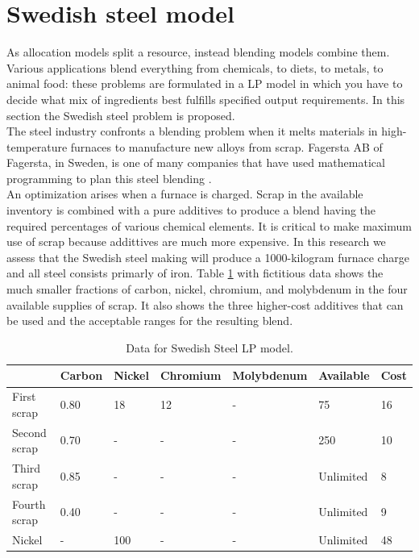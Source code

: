 \documentclass[a4paper,10 pt,titlepage,twoside]{report}
\theoremstyle{plain}
\theoremstyle{definition}
\theoremstyle{remark}
\begin{document}
{{\section{Swedish steel model}
As allocation models split a resource, instead blending models combine them. Various applications blend everything from chemicals, to diets, to metals, to animal food: these problems are formulated in a LP model in which you have to decide what mix of ingredients best fulfills specified output requirements. In this section the Swedish steel problem is proposed.\\
The steel industry confronts a blending problem when it melts materials in high-temperature furnaces to manufacture new alloys from scrap. Fagersta AB of Fagersta, in Sweden, is one of many companies that have used mathematical programming to plan this steel blending \cite{SSM}.\\
An optimization arises when a furnace is charged. Scrap in the available inventory is combined with a pure additives to produce a blend having the required percentages of various chemical elements. It is critical to make maximum use of scrap because addittives are much more expensive. In this research we assess that the Swedish steel making will produce a 1000-kilogram furnace charge and all steel consists primarly of iron. Table \ref{table:carbon} with fictitious data shows the much smaller fractions of carbon, nickel, chromium, and molybdenum in the four available supplies of scrap. It also shows the three higher-cost additives that can be used and the acceptable ranges for the resulting blend.\\
\begin{table}[h]\caption{\label{table:carbon}Data for Swedish Steel LP model.}
\begin{center}
	\begin{tabular}{@{}lllllll@{}}
		\toprule
		& Carbon & Nickel & Chromium & Molybdenum & Available & Cost \\ \midrule
		First scrap   & 0.80   & 18     & 12       & -          & 75        & 16   \\
		Second scrap  & 0.70   & -      & -        & -          & 250       & 10   \\
		Third scrap   & 0.85   & -      & -        & -          & Unlimited & 8    \\
		Fourth scrap  & 0.40   & -      & -        & -          & Unlimited & 9    \\
		Nickel        & -      & 100    & -        & -          & Unlimited & 48   \\

\end{tabular}
\end{center}
\end{table}}}
\end{document}
